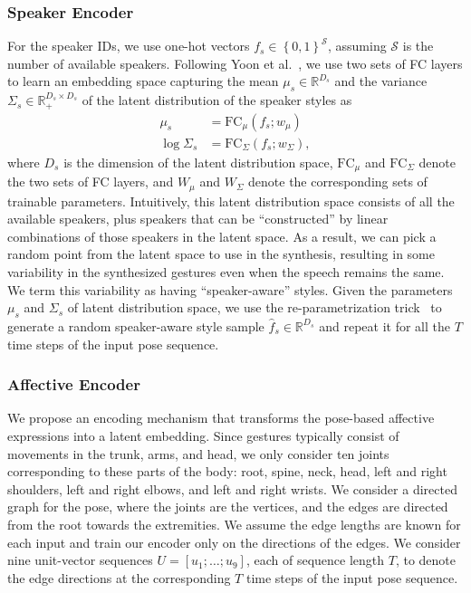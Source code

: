 \documentclass[conference,compsoc]{IEEEtran}
\theoremstyle{definition}
\newcommand{\parens}[1]{\left(#1\right)}
\newcommand{\braces}[1]{\left\{#1\right\}}
\newcommand{\bracks}[1]{\left[#1\right]}
\begin{document}
\subsubsection{Speaker Encoder}\label{subsubsec:speaker_encoder}
For the speaker IDs, we use one-hot vectors $f_s \in \braces{0, 1}^\mathcal{S}$, assuming $\mathcal{S}$ is the number of available speakers. Following Yoon et al.~\cite{trimodal}, we use two sets of FC layers to learn an embedding space capturing the mean $\mu_s \in \mathbb{R}^{D_s}$ and the variance $\Sigma_s \in \mathbb{R}^{D_s \times D_s}_+$ of the latent distribution of the speaker styles as
\begin{align}
    \mu_s &= \textrm{FC}_\mu\parens{f_s; w_\mu} \\
    \log\Sigma_s &= \textrm{FC}_\Sigma\parens{f_s; w_\Sigma},
\end{align}
where $D_s$ is the dimension of the latent distribution space, $\textrm{FC}_\mu$ and $\textrm{FC}_\Sigma$ denote the two sets of FC layers, and $W_\mu$ and $W_\Sigma$ denote the corresponding sets of trainable parameters. Intuitively, this latent distribution space consists of all the available speakers, plus speakers that can be ``constructed'' by linear combinations of those speakers in the latent space. As a result, we can pick a random point from the latent space to use in the synthesis, resulting in some variability in the synthesized gestures even when the speech remains the same. We term this variability as having ``speaker-aware'' styles. Given the parameters $\mu_s$ and $\Sigma_s$ of latent distribution space, we use the re-parametrization trick~\cite{vae} to generate a random speaker-aware style sample $\hat{f}_s \in \mathbb{R}^{D_s}$ and repeat it for all the $T$ time steps of the input pose sequence. 

\subsubsection{Affective Encoder}\label{subsubsec:aff_encoder}
We propose an encoding mechanism that transforms the pose-based affective expressions into a latent embedding. Since gestures typically consist of movements in the trunk, arms, and head, we only consider ten joints corresponding to these parts of the body: root, spine, neck, head, left and right shoulders, left and right elbows, and left and right wrists. We consider a directed graph for the pose, where the joints are the vertices, and the edges are directed from the root towards the extremities.
We assume the edge lengths are known for each input and train our encoder only on the directions of the edges. We consider nine unit-vector sequences $U = \bracks{u_1; \dots; u_9}$, each of sequence length $T$, to denote the edge directions at the corresponding $T$ time steps of the input pose sequence.
\end{document}
